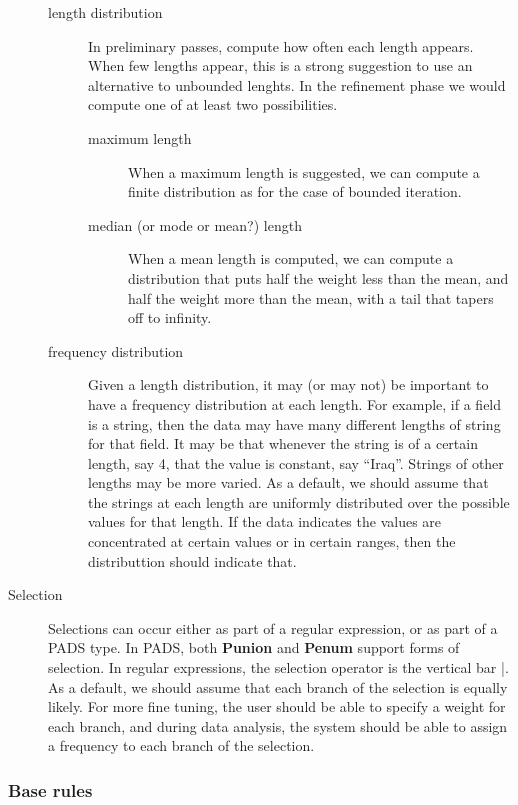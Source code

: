\begin{description}
\begin{description}
\item [length distribution]
In preliminary passes, compute how often each length appears. When few
lengths appear, this is a strong suggestion to use an alternative to
unbounded lenghts. In the refinement phase we would compute one of
at least two possibilities.
\begin{description}
\item [maximum length]
When a maximum length is suggested, we can compute a finite distribution
as for the case of bounded iteration.
\item [median (or mode or mean?) length]
When a mean length is computed, we can compute a distribution that puts
half the weight less than the mean, and half the weight more than the
mean, with a tail that tapers off to infinity.
\end{description}

\item [frequency distribution]
Given a length distribution, it may (or may not) be important to have
a frequency distribution at each length. For example, if a field is a
string, then the data may have many different lengths of string for
that field. It may be that whenever the string is of a certain length,
say 4, that the value is constant, say ``Iraq''. Strings of other
lengths may be more varied. As a default, we should assume that the
strings at each length are uniformly distributed over the possible
values for that length. If the data indicates the values are
concentrated at certain values or in certain ranges, then the
distributtion should indicate that.

\end{description}

\item [Selection]
Selections can occur either as part of a regular expression, or as
part of a PADS type. In PADS, both \textbf{Punion} and \textbf{Penum}
support forms of selection. In regular expressions, the selection
operator is the vertical bar \textsf{|}. As a default, we should
assume that each branch of the selection is equally likely. For more
fine tuning, the user should be able to specify a weight for each
branch, and during data analysis, the system should be able to assign
a frequency to each branch of the selection.

\end{description}

\subsubsection{Base rules}

